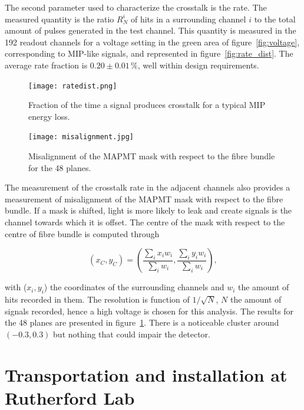 \documentclass[a4paper,11pt]{article}
\begin{document}
The second parameter used to characterize the crosstalk is the rate. The measured quantity is the ratio $R_N^i$ of hits in a surrounding channel $i$ to the total amount of pulses generated in the test channel. This quantity is measured in the 192 readout channels for a voltage setting in the green area of figure~\ref{fig:voltage}, corresponding to MIP-like signals, and represented in figure~\ref{fig:rate_dist}. The average rate fraction is $0.20\pm0.01\,\%$, well within design requirements.

\begin{figure}[htr!]
  \begin{minipage}[b]{.49\textwidth}
   \centering
   \texttt{[image: ratedist.png]}
   \caption{Fraction of the time a signal produces crosstalk for a typical MIP energy loss.}
   \label{fig:rate_dist}
  \end{minipage}
  \begin{minipage}[b]{.49\textwidth}
   \centering
   \texttt{[image: misalignment.jpg]}
   \caption{Misalignment of the MAPMT mask with respect to the fibre bundle for the 48 planes.}
   \label{fig:misalignment}
  \end{minipage}
\end{figure}

The measurement of the crosstalk rate in the adjacent channels also provides a measurement of misalignment of the MAPMT mask with respect to the fibre bundle. If a mask is shifted, light is more likely to leak and create signals is the channel towards which it is offset. The centre of the mask with respect to the centre of fibre bundle is computed through

\begin{equation}
(x_C,y_C)=\left(\frac{\sum_ix_iw_i}{\sum_iw_i},\frac{\sum_iy_iw_i}{\sum_iw_i}\right),
\end{equation}

with ($x_i,y_i$) the coordinates of the surrounding channels and $w_i$ the amount of hits recorded in them. The resolution is function of $1/\sqrt{N}$, $N$ the amount of signals recorded, hence a high voltage is chosen for this analysis. The results for the 48 planes are presented in figure~\ref{fig:misalignment}. There is a noticeable cluster around $(-0.3,0.3)$ but nothing that could impair the detector.



\section{Transportation and installation at Rutherford Lab}
\end{document}
